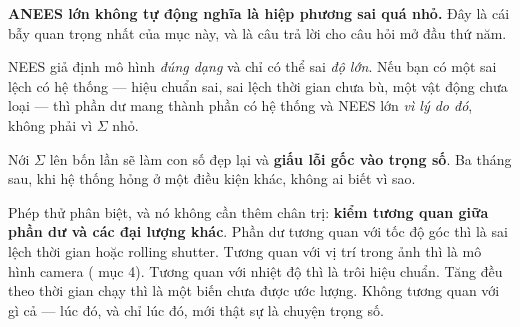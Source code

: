 \documentclass[../../vslam.tex]{subfiles}
\begin{document}
\begin{cambay}
\textbf{ANEES lớn không tự động nghĩa là hiệp phương sai quá nhỏ.} Đây là cái bẫy quan trọng nhất của mục này, và là câu trả lời cho câu hỏi mở đầu thứ năm.

NEES giả định mô hình \emph{đúng dạng} và chỉ có thể sai \emph{độ lớn}. Nếu bạn có một sai lệch có hệ thống --- hiệu chuẩn sai, sai lệch thời gian chưa bù, một vật động chưa loại --- thì phần dư mang thành phần có hệ thống và NEES lớn \emph{vì lý do đó}, không phải vì \(\Sigma\) nhỏ.

Nới \(\Sigma\) lên bốn lần sẽ làm con số đẹp lại và \textbf{giấu lỗi gốc vào trọng số}. Ba tháng sau, khi hệ thống hỏng ở một điều kiện khác, không ai biết vì sao.

Phép thử phân biệt, và nó không cần thêm chân trị: \textbf{kiểm tương quan giữa phần dư và các đại lượng khác}. Phần dư tương quan với tốc độ góc thì là sai lệch thời gian hoặc rolling shutter. Tương quan với vị trí trong ảnh thì là mô hình camera ( mục 4). Tương quan với nhiệt độ thì là trôi hiệu chuẩn. Tăng đều theo thời gian chạy thì là một biến chưa được ước lượng. Không tương quan với gì cả --- lúc đó, và chỉ lúc đó, mới thật sự là chuyện trọng số.
\end{cambay}

\begin{ungdung}
\end{ungdung}
\end{document}
